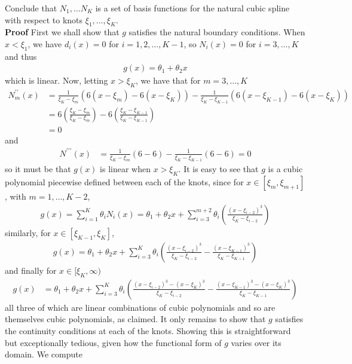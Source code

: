 \documentclass[10pt]{article}
\newcommand{\bp}[1]{\left({#1}\right)}
\newcommand{\1}[1]{\mathbbm{1}_{#1}}
\begin{document}
    Conclude that $N_1,\dots N_K$ is a set of basis functions for the natural cubic spline with respect to knots $\xi_1,\dots,\xi_K$. \\[5pt]
    {\bf Proof}\hspace{5pt} First we shall show that $g$ satisfies the natural boundary conditions. When $x<\xi_1$, we have $d_i(x)=0$ for $i=1,2,\dots,K-1$, so $N_i(x)=0$ for $i=3,\dots,K$ and thus
    \begin{align*} 
        g(x)=\theta_1+\theta_2x
    \end{align*}
    which is linear. Now, letting $x>\xi_K$, we have that for $m=3,\dots,K$
    \begin{align*}
        N_m^{\prime\prime}(x)&=\frac{1}{\xi_K-\xi_m}\bp{6(x-\xi_m)-6(x-\xi_K)}-\frac{1}{\xi_K-\xi_{K-1}}\bp{6(x-\xi_{K-1})-6(x-\xi_K)}\\
        &=6\bp{\frac{\xi_K-\xi_m}{\xi_K-\xi_m}}-6\bp{\frac{\xi_K-\xi_{K-1}}{\xi_K-\xi_{K-1}}}\\
        &=0
    \end{align*}
    and
    \begin{align*}
        N^{\prime\prime\prime}(x)&=\frac{1}{\xi_{K}-\xi_m}(6-6)-\frac{1}{\xi_K-\xi_{K-1}}(6-6)=0
    \end{align*}
    so it must be that $g(x)$ is linear when $x>\xi_K$. It is easy to see that $g$ is a cubic polynomial piecewise defined between each of the knots, since for $x\in[\xi_m,\xi_{m+1}]$, with $m=1,\dots,K-2$,
    \begin{align*}
        g(x)=\sum_{i=1}^K\theta_iN_i(x)=\theta_1+\theta_2x+\sum_{i=3}^{m+2}\theta_i\bp{\frac{(x-\xi_{i-2})^3}{\xi_K-\xi_{i-2}}}
    \end{align*}
    similarly, for $x\in[\xi_{K-1},\xi_K]$,
    \begin{align*}
        g(x)=\theta_1+\theta_2x+\sum_{i=3}^{K}\theta_i\bp{\frac{(x-\xi_{i-2})^3}{\xi_K-\xi_{i-2}}-\frac{(x-\xi_{K-1})^3}{\xi_K-\xi_{K-1}}}
    \end{align*}
    and finally for $x\in [\xi_{K},\infty)$
    \begin{align*}
        g(x)&=\theta_1+\theta_2x+\sum_{i=3}^K\theta_i\bp{\frac{(x-\xi_{i-2})^3-(x-\xi_K)^3}{\xi_K-\xi_{i-2}}-\frac{(x-\xi_{K-1})^3-(x-\xi_K)^3}{\xi_K-\xi_{K-1}}}
    \end{align*}
    all three of which are linear combinations of cubic polynomials and so are themselves cubic polynomials, as claimed. It only remains to show that $g$ satisfies the continuity conditions at each of the knots. 
    Showing this is straightforward but exceptionally tedious, given how the functional form of $g$ varies over its domain. We compute
\end{document}
